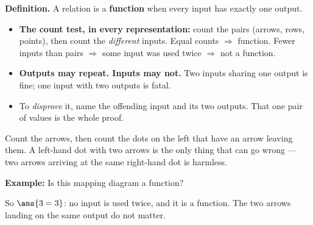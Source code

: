 \documentclass[12pt]{article}
\begin{document}

\begin{formulabox}
\textbf{Definition.} A relation is a \textbf{function} when every input has
exactly one output.
\begin{itemize}[leftmargin=1.1cm, itemsep=1pt, topsep=2pt]
\item \textbf{The count test, in every representation:} count the pairs
(arrows, rows, points), then count the \emph{different} inputs. Equal counts
$\Rightarrow$ function. Fewer inputs than pairs $\Rightarrow$ some input was
used twice $\Rightarrow$ not a function.
\item \textbf{Outputs may repeat. Inputs may not.} Two inputs sharing one
output is fine; one input with two outputs is fatal.
\item To \emph{disprove} it, name the offending input and its two outputs. That
one pair of values is the whole proof.
\end{itemize}
\end{formulabox}


\begin{formulabox}
Count the arrows, then count the dots on the left that have an arrow leaving
them. A left-hand dot with two arrows is the only thing that can go wrong ---
two arrows arriving at the same right-hand dot is harmless.
\end{formulabox}

\begin{examplebox}
\textbf{Example:} Is this mapping diagram a function?
\begin{center}
\end{center}
So $\ans{3 = 3}$: no input is used twice, and it is a function. The two arrows
landing on the same output do not matter.
\end{examplebox}
\end{document}
